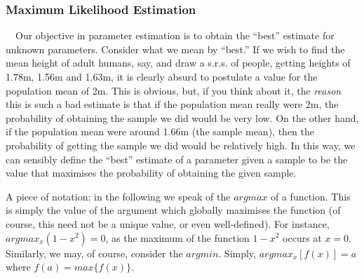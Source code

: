 \documentclass[12pt,a4paper]{article}
\begin{document}
\subsubsection{Maximum Likelihood Estimation}

$\quad$Our objective in parameter estimation is to obtain the ``best'' estimate for unknown parameters. Consider what we mean by ``best.'' If we wish to find the mean height of adult humans, say, and draw a s.r.s. of people, getting heights of 1.78m, 1.56m and 1.63m, it is clearly absurd to postulate a value for the population mean of 2m. This is obvious, but, if you think about it, the \emph{reason} this is such a bad estimate is that if the population mean really were 2m, the probability of obtaining the sample we did would be very low. On the other hand, if the population mean were around 1.66m (the sample mean), then the probability of getting the sample we did would be relatively high. In this way, we can sensibly define the ``best'' estimate of a parameter given a sample to be the value that maximises the probability of obtaining the given sample.

A piece of notation: in the following we speak of the $argmax$ of a function. This is simply the value of the argument which globally maximises the function (of course, this need not be a unique value, or even well-defined). For instance, $argmax_x (1-x^2) = 0$, as the maximum of the function $1 - x^2$ occurs at $x=0$. Similarly, we may, of course, consider the $argmin$. Simply, $argmax_x[f(x)] = a$ where $f(a) = max\{f(x)\}$.
\end{document}
